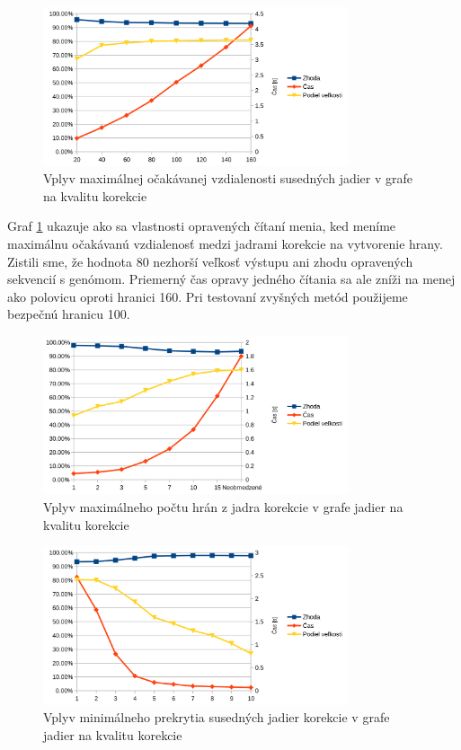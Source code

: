 \begin{figure}
    \centering
    \includegraphics[width=0.8\textwidth]{images/max_node_distance.png}
    \caption{Vplyv maximálnej očakávanej vzdialenosti susedných jadier v grafe na kvalitu korekcie}
    \label{fig:max_node_distance}
\end{figure} 

Graf \ref{fig:max_node_distance} ukazuje ako sa vlastnosti opravených čítaní menia, ked meníme maximálnu očakávanú vzdialenosť medzi jadrami korekcie na vytvorenie hrany. Zistili sme, že hodnota 80 nezhorší veľkosť výstupu ani zhodu opravených sekvencií s genómom. Priemerný čas opravy jedného čítania sa ale zníži na menej ako polovicu oproti hranici 160. Pri testovaní zvyšných metód použijeme bezpečnú hranicu 100.


\begin{figure}
    \centering
    \includegraphics[width=0.8\textwidth]{images/max_edges_from_node.png}
    \caption{Vplyv maximálneho počtu hrán z jadra korekcie v grafe jadier na kvalitu korekcie}
    \label{fig:max_edges_from_node}
\end{figure} 

\begin{figure}
    \centering
    \includegraphics[width=0.8\textwidth]{images/min_node_overlap.png}
    \caption{Vplyv minimálneho prekrytia susedných jadier korekcie v grafe jadier na kvalitu korekcie}
    \label{fig:min_node_overlap}
\end{figure} 

